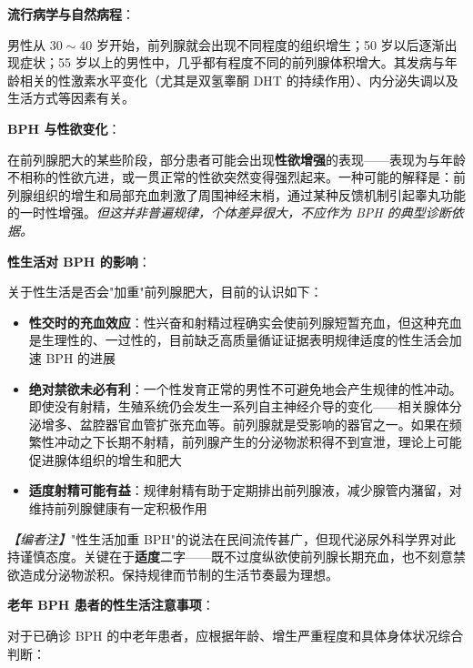 \vspace{0.5em}
\noindent\textbf{流行病学与自然病程}：

男性从 $30\sim40$ 岁开始，前列腺就会出现不同程度的组织增生；50 岁以后逐渐出现症状；55 岁以上的男性中，几乎都有程度不同的前列腺体积增大。其发病与年龄相关的性激素水平变化（尤其是双氢睾酮 DHT 的持续作用）、内分泌失调以及生活方式等因素有关。

\vspace{0.5em}
\noindent\textbf{BPH 与性欲变化}：

在前列腺肥大的某些阶段，部分患者可能会出现\textbf{性欲增强}的表现——表现为与年龄不相称的性欲亢进，或一贯正常的性欲突然变得强烈起来。一种可能的解释是：前列腺组织的增生和局部充血刺激了周围神经末梢，通过某种反馈机制引起睾丸功能的一时性增强。\textit{但这并非普遍规律，个体差异很大，不应作为 BPH 的典型诊断依据。}

\vspace{0.5em}
\noindent\textbf{性生活对 BPH 的影响}：

关于性生活是否会"加重"前列腺肥大，目前的认识如下：

\begin{itemize}
	\item \textbf{性交时的充血效应}：性兴奋和射精过程确实会使前列腺短暂充血，但这种充血是生理性的、一过性的，目前缺乏高质量循证证据表明规律适度的性生活会加速 BPH 的进展
	\item \textbf{绝对禁欲未必有利}：一个性发育正常的男性不可避免地会产生规律的性冲动。即使没有射精，生殖系统仍会发生一系列自主神经介导的变化——相关腺体分泌增多、盆腔器官血管扩张充血等。前列腺就是受影响的器官之一。如果在频繁性冲动之下长期不射精，前列腺产生的分泌物淤积得不到宣泄，理论上可能促进腺体组织的增生和肥大
	\item \textbf{适度射精可能有益}：规律射精有助于定期排出前列腺液，减少腺管内潴留，对维持前列腺健康有一定积极作用
\end{itemize}

\noindent\textit{【编者注】}"性生活加重 BPH"的说法在民间流传甚广，但现代泌尿外科学界对此持谨慎态度。关键在于\textbf{适度}二字——既不过度纵欲使前列腺长期充血，也不刻意禁欲造成分泌物淤积。保持规律而节制的生活节奏最为理想。

\vspace{0.5em}
\noindent\textbf{老年 BPH 患者的性生活注意事项}：

对于已确诊 BPH 的中老年患者，应根据年龄、增生严重程度和具体身体状况综合判断：


